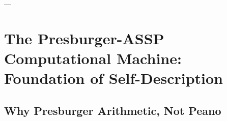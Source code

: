 \documentclass[11pt,a4paper]{article}
\begin{document}

---

\section{The Presburger-ASSP Computational Machine: Foundation of Self-Description}

  \subsection{Why Presburger Arithmetic, Not Peano}
\end{document}

